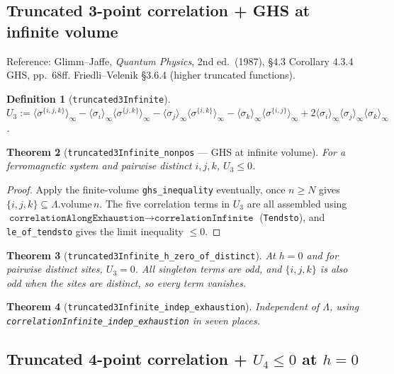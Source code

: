 \documentclass[a4paper,11pt]{article}
\newtheorem{theorem}{Theorem}
\newtheorem{definition}[theorem]{Definition}
\begin{document}
\subsection{Truncated 3-point correlation + GHS at infinite volume}

Reference: Glimm--Jaffe, \textit{Quantum Physics}, 2nd ed.\ (1987),
\S 4.3 Corollary 4.3.4 GHS, pp.\ 68ff.
Friedli--Velenik \S 3.6.4 (higher truncated functions).

\begin{definition}[\texttt{truncated3Infinite}]
$U_3 := \langle \sigma^{\{i,j,k\}} \rangle_\infty
  - \langle \sigma_i \rangle_\infty \langle \sigma^{\{j,k\}} \rangle_\infty
  - \langle \sigma_j \rangle_\infty \langle \sigma^{\{i,k\}} \rangle_\infty
  - \langle \sigma_k \rangle_\infty \langle \sigma^{\{i,j\}} \rangle_\infty
  + 2 \langle \sigma_i \rangle_\infty \langle \sigma_j \rangle_\infty \langle \sigma_k \rangle_\infty$.
\end{definition}

\begin{theorem}[\texttt{truncated3Infinite\_nonpos} — GHS at infinite volume]
For a ferromagnetic system and pairwise distinct $i, j, k$, $U_3 \le 0$.
\end{theorem}

\begin{proof}
Apply the finite-volume \texttt{ghs\_inequality} eventually, once
$n \ge N$ gives $\{i,j,k\} \subseteq \Lambda.\text{volume}\,n$. The five
correlation terms in $U_3$ are all assembled using
$\texttt{correlationAlongExhaustion} \to \texttt{correlationInfinite}$
(\texttt{Tendsto}), and \texttt{le\_of\_tendsto} gives the limit inequality
$\le 0$.
\end{proof}

\begin{theorem}[\texttt{truncated3Infinite\_h\_zero\_of\_distinct}]
At $h = 0$ and for pairwise distinct sites, $U_3 = 0$. All singleton terms
are odd, and $\{i, j, k\}$ is also odd when the sites are distinct, so every
term vanishes.
\end{theorem}

\begin{theorem}[\texttt{truncated3Infinite\_indep\_exhaustion}]
Independent of $\Lambda$, using \texttt{correlationInfinite\_indep\_exhaustion}
in seven places.
\end{theorem}

\subsection{Truncated 4-point correlation + \texorpdfstring{$U_4 \le 0$}{U4 <= 0} at \texorpdfstring{$h = 0$}{h = 0}}
\end{document}
